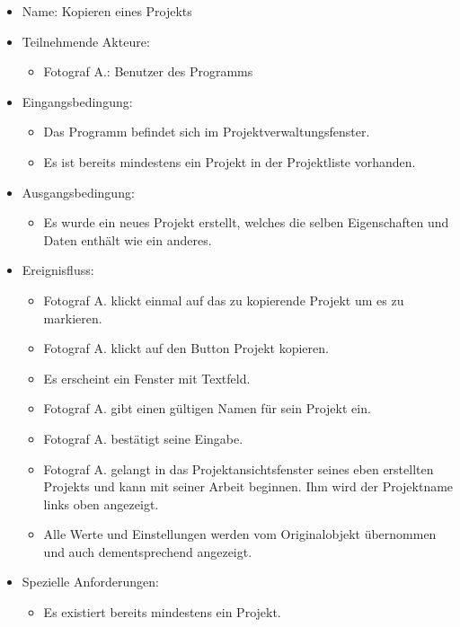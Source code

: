 		\begin{itemize}
			\item Name: Kopieren eines Projekts
			\item Teilnehmende Akteure:
			\begin{itemize}
				\item	Fotograf A.: Benutzer des Programms		
			\end{itemize}
			\item Eingangsbedingung:
			\begin{itemize}
				\item	Das Programm befindet sich im Projektverwaltungsfenster.
				\item Es ist bereits mindestens ein Projekt in der Projektliste vorhanden.			
			\end{itemize}
			\item Ausgangsbedingung:
			\begin{itemize}
				\item	Es wurde ein neues Projekt erstellt, welches die selben Eigenschaften und Daten enthält wie ein anderes.	
			\end{itemize}
			\item Ereignisfluss:
			\begin{itemize}
				\item Fotograf A. klickt einmal auf das zu kopierende Projekt um es zu markieren.
				\item Fotograf A. klickt auf den Button Projekt kopieren.
				\item Es erscheint ein Fenster mit Textfeld.
				\item Fotograf A. gibt einen gültigen Namen für sein Projekt ein.
				\item Fotograf A. bestätigt seine Eingabe.
				\item Fotograf A. gelangt in das Projektansichtsfenster seines eben erstellten Projekts und kann mit seiner Arbeit beginnen. Ihm wird der Projektname links oben angezeigt.
				\item Alle Werte und Einstellungen werden vom Originalobjekt übernommen und auch dementsprechend angezeigt.
			\end{itemize}
			\item Spezielle Anforderungen:
			\begin{itemize}
				\item	Es existiert bereits mindestens ein Projekt.		
			\end{itemize}			
		\end{itemize}
		
